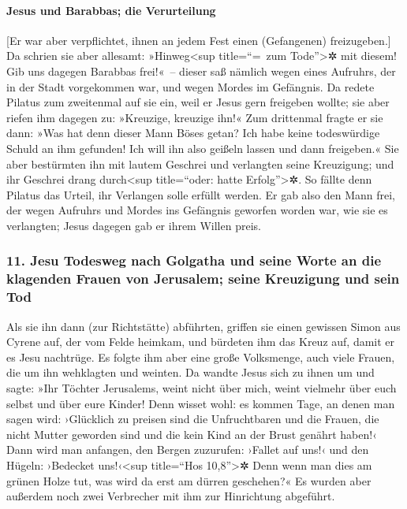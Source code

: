 \hypertarget{jesus-und-barabbas-die-verurteilung}{%
\paragraph{Jesus und Barabbas; die
Verurteilung}\label{jesus-und-barabbas-die-verurteilung}}

 {[}Er war aber verpflichtet, ihnen an jedem Fest einen
(Gefangenen) freizugeben.{]}  Da schrien sie aber
allesamt: »Hinweg\textless sup title=``=~zum Tode''\textgreater✲ mit
diesem! Gib uns dagegen Barabbas frei!«~--  dieser saß
nämlich wegen eines Aufruhrs, der in der Stadt vorgekommen war, und
wegen Mordes im Gefängnis.  Da redete Pilatus zum
zweitenmal auf sie ein, weil er Jesus gern freigeben wollte;
 sie aber riefen ihm dagegen zu: »Kreuzige, kreuzige
ihn!«  Zum drittenmal fragte er sie dann: »Was hat denn
dieser Mann Böses getan? Ich habe keine todeswürdige Schuld an ihm
gefunden! Ich will ihn also geißeln lassen und dann freigeben.«
 Sie aber bestürmten ihn mit lautem Geschrei und
verlangten seine Kreuzigung; und ihr Geschrei drang durch\textless sup
title=``oder: hatte Erfolg''\textgreater✲.  So fällte
denn Pilatus das Urteil, ihr Verlangen solle erfüllt werden.
 Er gab also den Mann frei, der wegen Aufruhrs und Mordes
ins Gefängnis geworfen worden war, wie sie es verlangten; Jesus dagegen
gab er ihrem Willen preis.

\hypertarget{jesu-todesweg-nach-golgatha-und-seine-worte-an-die-klagenden-frauen-von-jerusalem-seine-kreuzigung-und-sein-tod}{%
\subsubsection{11. Jesu Todesweg nach Golgatha und seine Worte an die
klagenden Frauen von Jerusalem; seine Kreuzigung und sein
Tod}\label{jesu-todesweg-nach-golgatha-und-seine-worte-an-die-klagenden-frauen-von-jerusalem-seine-kreuzigung-und-sein-tod}}

 Als sie ihn dann (zur Richtstätte) abführten, griffen
sie einen gewissen Simon aus Cyrene auf, der vom Felde heimkam, und
bürdeten ihm das Kreuz auf, damit er es Jesu nachtrüge. 
Es folgte ihm aber eine große Volksmenge, auch viele Frauen, die um ihn
wehklagten und weinten.  Da wandte Jesus sich zu ihnen um
und sagte: »Ihr Töchter Jerusalems, weint nicht über mich, weint
vielmehr über euch selbst und über eure Kinder!  Denn
wisset wohl: es kommen Tage, an denen man sagen wird: ›Glücklich zu
preisen sind die Unfruchtbaren und die Frauen, die nicht Mutter geworden
sind und die kein Kind an der Brust genährt haben!‹  Dann
wird man anfangen, den Bergen zuzurufen: ›Fallet auf uns!‹ und den
Hügeln: ›Bedecket uns!‹\textless sup title=``Hos 10,8''\textgreater✲
 Denn wenn man dies am grünen Holze tut, was wird da erst
am dürren geschehen?«  Es wurden aber außerdem noch zwei
Verbrecher mit ihm zur Hinrichtung abgeführt.

